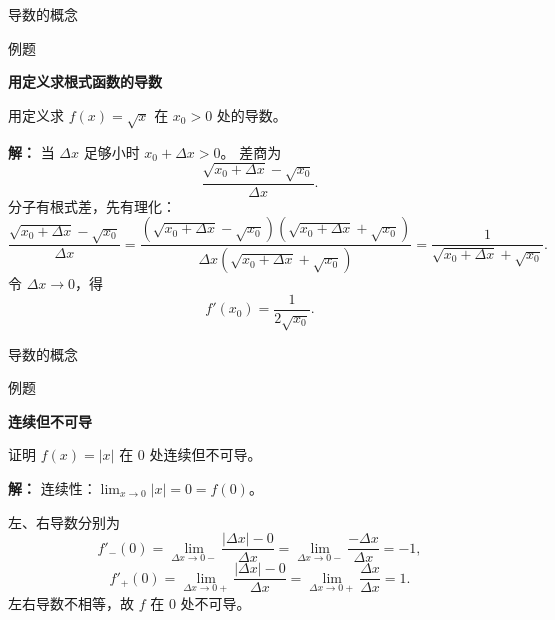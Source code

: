 \documentclass[aspectratio=169,10pt,fontset=fandol]{ctexbeamer}
\newenvironment{idea}{\par\noindent\textbf{思路}\quad}{\par\vspace{0.4em}}
\begin{document}
\begin{frame}[t,fragile]{导数的概念}
\normalsize
\begin{block}{例题}
{\normalsize
\textbf{用定义求根式函数的导数}\par

用定义求 $f(x)=\sqrt{x}$ 在 $x_0>0$ 处的导数。

}
\end{block}
\pause
{\normalsize
\textbf{解：}
当 $\Delta x$ 足够小时 $x_0+\Delta x>0$。 差商为
\[
\frac{\sqrt{x_0+\Delta x}-\sqrt{x_0}}{\Delta x}.
\]
分子有根式差，先有理化：
\[
\frac{\sqrt{x_0+\Delta x}-\sqrt{x_0}}{\Delta x}
=\frac{(\sqrt{x_0+\Delta x}-\sqrt{x_0})(\sqrt{x_0+\Delta x}+\sqrt{x_0})}{\Delta x(\sqrt{x_0+\Delta x}+\sqrt{x_0})}
=\frac1{\sqrt{x_0+\Delta x}+\sqrt{x_0}}.
\]
令 $\Delta x\to0$，得
\[
f'(x_0)=\frac1{2\sqrt{x_0}}.
\]

}
\end{frame}
\begin{frame}[t,fragile]{导数的概念}
\normalsize
\begin{block}{例题}
{\normalsize
\textbf{连续但不可导}\par

证明 $f(x)=|x|$ 在 $0$ 处连续但不可导。

}
\end{block}
\pause
{\normalsize
\textbf{解：}
连续性：$\lim_{x\to0}|x|=0=f(0)$。

左、右导数分别为
\[
f'_-(0)=\lim_{\Delta x\to0-}\frac{|\Delta x|-0}{\Delta x}
=\lim_{\Delta x\to0-}\frac{-\Delta x}{\Delta x}=-1,
\]
\[
f'_+(0)=\lim_{\Delta x\to0+}\frac{|\Delta x|-0}{\Delta x}
=\lim_{\Delta x\to0+}\frac{\Delta x}{\Delta x}=1.
\]
左右导数不相等，故 $f$ 在 $0$ 处不可导。

}
\end{frame}
\end{document}

